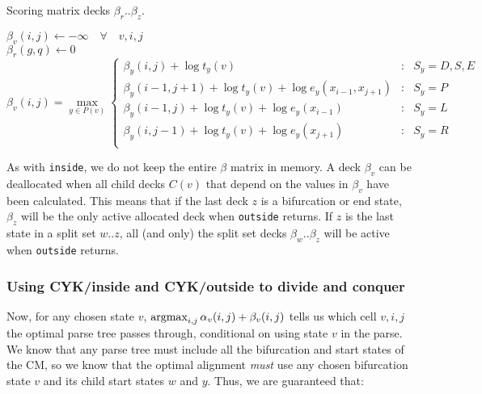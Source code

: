\documentclass[11pt]{article}
\def\argmax{\mathop{\mathrm{argmax}}\limits}
\begin{document}
\begin{algorithm}
         {Scoring matrix decks $\beta_r..\beta_z$.}
\begin{algtab*}
 $\beta_v(i,j) \leftarrow -\infty \quad \forall \quad v,i,j$\\
 $\beta_r(g,q) \leftarrow 0$\\
       $\beta_v(i,j) = \max\limits_{y \in P(v)} \left\{
              \begin{array}{rcl}
              \beta_y(i,j) + \log t_y(v) &:&  S_y = D,S,E \\
              \beta_y(i-1,j+1) + \log t_y(v) + \log e_y(x_{i-1}, x_{j+1}) &:& S_y = P\\
              \beta_y(i-1,j) + \log t_y(v) + \log e_y(x_{i-1}) &:& S_y = L\\
              \beta_y(i,j-1) + \log t_y(v) + \log e_y(x_{j+1})  &:& S_y = R \\
              \end{array} \right.$
\end{algtab*}
\end{algorithm}

As with \texttt{inside}, we do not keep the entire $\beta$ matrix in
memory. A deck $\beta_v$ can be deallocated when all child decks
$C(v)$ that depend on the values in $\beta_v$ have been
calculated. This means that if the last deck $z$ is a bifurcation or
end state, $\beta_z$ will be the only active allocated deck when
\texttt{outside} returns. If $z$ is the last state in a split set
$w..z$, all (and only) the split set decks $\beta_w..\beta_z$ will be
active when \texttt{outside} returns.

\subsubsection{Using CYK/inside and CYK/outside to divide and conquer}

Now, for any chosen state $v$, $\argmax\nolimits_{i,j} \alpha_{v}(i,j) +
\beta_{v}(i,j)$ tells us which cell $v,i,j$ the optimal parse tree
passes through, conditional on using state $v$ in the parse. We know
that any parse tree must include all the bifurcation and start states
of the CM, so we know that the optimal alignment \emph{must} use any
chosen bifurcation state $v$ and its child start states $w$ and
$y$. Thus, we are guaranteed that:
\end{document}
